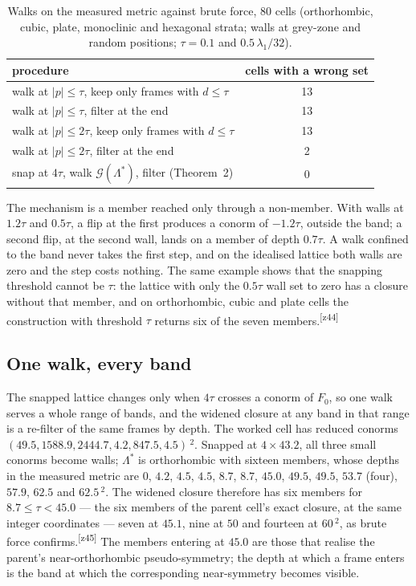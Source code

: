 \documentclass[preprint,pdf]{iucr}          %
\newcommand{\Ang}{\text{\AA}}
\newcommand{\Cl}{\mathcal{G}}
\newcommand{\chk}[1]{\textsuperscript{[#1]}}
\begin{document}
\begin{table}
\caption{Walks on the measured metric against brute force, 80 cells (orthorhombic, cubic, plate, monoclinic and hexagonal strata; walls at grey-zone and random positions; $\tau=0.1$ and $0.5\,\lambda_1/32$).}
\label{tab:walks}
\begin{tabular}{lc}
\toprule
procedure & cells with a wrong set \\
\midrule
walk at $|p|\le\tau$, keep only frames with $d\le\tau$ & 13 \\
walk at $|p|\le\tau$, filter at the end & 13 \\
walk at $|p|\le2\tau$, keep only frames with $d\le\tau$ & 13 \\
walk at $|p|\le2\tau$, filter at the end & 2 \\
snap at $4\tau$, walk $\Cl(\Lambda^*)$, filter (Theorem~2) & 0 \\
\bottomrule
\end{tabular}
\end{table}

The mechanism is a member reached only through a non-member. With walls at $1.2\tau$ and $0.5\tau$, a flip at the first produces a conorm of $-1.2\tau$, outside the band; a second flip, at the second wall, lands on a member of depth $0.7\tau$. A walk confined to the band never takes the first step, and on the idealised lattice both walls are zero and the step costs nothing. The same example shows that the snapping threshold cannot be $\tau$: the lattice with only the $0.5\tau$ wall set to zero has a closure without that member, and on orthorhombic, cubic and plate cells the construction with threshold $\tau$ returns six of the seven members.\chk{z44}

\subsection{One walk, every band}
\label{sec:ladder}
The snapped lattice changes only when $4\tau$ crosses a conorm of $F_0$, so one walk serves a whole range of bands, and the widened closure at any band in that range is a re-filter of the same frames by depth. The worked cell has reduced conorms $(49.5, 1588.9, 2444.7, 4.2, 847.5, 4.5)$\,\Ang$^2$. Snapped at $4\times43.2$, all three small conorms become walls; $\Lambda^*$ is orthorhombic with sixteen members, whose depths in the measured metric are $0$, $4.2$, $4.5$, $4.5$, $8.7$, $8.7$, $45.0$, $49.5$, $49.5$, $53.7$ (four), $57.9$, $62.5$ and $62.5$\,\Ang$^2$. The widened closure therefore has six members for $8.7\le\tau<45.0$ --- the six members of the parent cell's exact closure, at the same integer coordinates --- seven at $45.1$, nine at $50$ and fourteen at $60$\,\Ang$^2$, as brute force confirms.\chk{z45} The members entering at $45.0$ are those that realise the parent's near-orthorhombic pseudo-symmetry; the depth at which a frame enters is the band at which the corresponding near-symmetry becomes visible.
\end{document}
